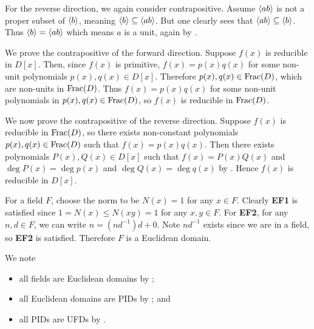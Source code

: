 \begin{questions}
    For the reverse direction, we again consider contrapositive. Assume $\left\langle ab\right\rangle$ is not a proper subset of $\left\langle b\right\rangle$, meaning $\left\langle b\right\rangle \subseteq \left\langle ab\right\rangle$. But one clearly sees that $\left\langle ab\right\rangle \subseteq \left\langle b\right\rangle$. Thus $\left\langle b\right\rangle = \left\langle ab\right\rangle$ which means $a$ is a unit, again by .

    \item We prove the contrapositive of the forward direction. Suppose $f(x)$ is reducible in $D[x]$. Then, since $f(x)$ is primitive, $f(x) = p(x)q(x)$ for some non-unit polynomials $p(x), q(x) \in D[x]$. Therefore $p(x), q(x) \in \mathrm{Frac}(D)$, which are non-units in $\mathrm{Frac}(D)$. Thus $f(x) = p(x)q(x)$ for some non-unit polynomials in $p(x), q(x) \in \mathrm{Frac}(D)$, so $f(x)$ is reducible in $\mathrm{Frac}(D)$.

    We now prove the contrapositive of the reverse direction. Suppose $f(x)$ is reducible in $\mathrm{Frac}(D)$, so there exists non-constant polynomials $p(x), q(x) \in \mathrm{Frac}(D)$ such that $f(x) = p(x)q(x)$. Then there exists polynomials $P(x), Q(x) \in D[x]$ such that $f(x) = P(x)Q(x)$ and $\deg P(x) = \deg p(x)$ and $\deg Q(x) = \deg q(x)$ by . Hence $f(x)$ is reducible in $D[x]$.

    \item For a field $F$, choose the norm to be $N(x) = 1$ for any $x \in F$. Clearly \textbf{EF1} is satisfied since $1 = N(x) \leq N(xy) = 1$ for any $x,y\in F$. For \textbf{EF2}, for any $n, d \in F$, we can write $n = (nd^{-1})d + 0$. Note $nd^{-1}$ exists since we are in a field, so \textbf{EF2} is satisfied. Therefore $F$ is a Euclidean domain.

    \item We note
    \begin{itemize}
        \item all fields are Euclidean domains by ;
        \item all Euclidean domains are PIDs by ; and
        \item all PIDs are UFDs by .
    \end{itemize}
\end{questions}

